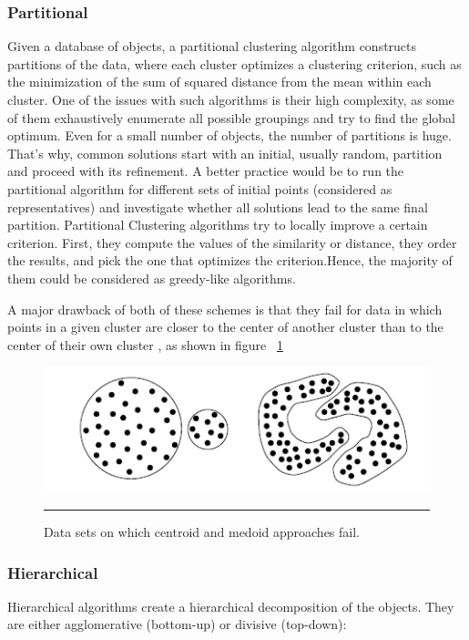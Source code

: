 \subsubsection{Partitional}
Given a database of objects, a partitional clustering algorithm constructs
partitions of the data, where each cluster optimizes a clustering criterion, such as the minimization of the sum of squared distance from the mean within each cluster.
One of the issues with such algorithms is their high complexity, as some of them exhaustively enumerate
all possible groupings and try to find the global optimum. Even for a small number of objects,
the number of partitions is huge. That’s why, common solutions start with an initial, usually
random, partition and proceed with its refinement. A better practice would be to run the partitional algorithm for different sets of initial points (considered as representatives) and investigate whether all solutions lead to the same final partition.
Partitional Clustering algorithms try to locally improve a certain criterion. First, they compute the
values of the similarity or distance, they order the results, and pick the one that optimizes the criterion.Hence, the majority of them could be considered as greedy-like algorithms.


A major drawback of both of these schemes is that they fail for data in which points in a given cluster are closer
to the center of another cluster than to the center of their own cluster \citep{clustering_14}, as shown in figure ~\ref{fig:kmeans_fail}

\begin{figure}[htbp]
	\centering
		\includegraphics{./Figures/clustering_2.png}
		\rule{35em}{0.5pt}
	\caption[Data sets on which centroid and medoid approaches fail.]{Data sets on which centroid and medoid approaches fail.}
	\label{fig:kmeans_fail}
\end{figure}


\subsubsection{Hierarchical}
Hierarchical algorithms create a hierarchical decomposition of the objects. They are either
agglomerative (bottom-up) or divisive (top-down):
